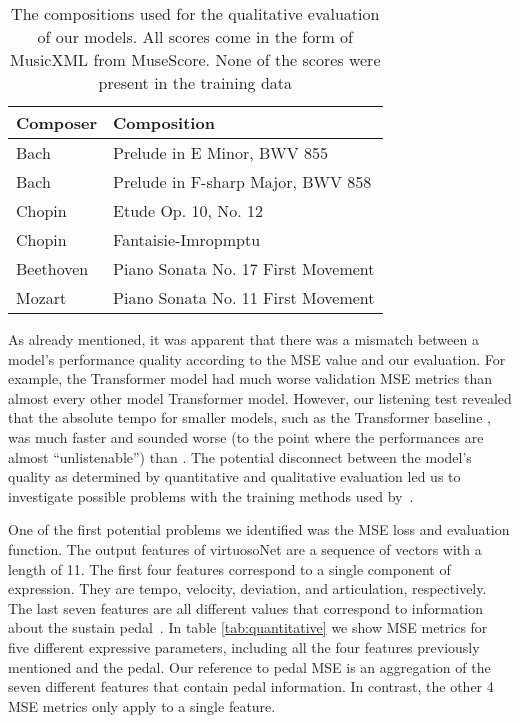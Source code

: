 \begin{table}
    \setlength{\extrarowheight}{3pt}
    \begin{center}
    \begin{tabular}[]{| l | l |}
        \hline
        Composer & Composition \\ 
        \hline 
        Bach & Prelude in E Minor, BWV 855 \\
        Bach & Prelude in F-sharp Major, BWV 858  \\ 
        Chopin & Etude Op. 10, No. 12 \\ 
        Chopin & Fantaisie-Imropmptu \\ 
        Beethoven & Piano Sonata No. 17 First Movement \\ 
        Mozart & Piano Sonata No. 11 First Movement \\ 
        \hline
    \end{tabular}
    \caption{The compositions used for the qualitative evaluation of our models. All scores come in the form of MusicXML from MuseScore. None of the scores were present in the training data}
    \label{tab:compositions}
    \end{center}
\end{table}

As already mentioned, it was apparent that there was a mismatch between a model's performance quality according to the MSE value and our evaluation. For example, the Transformer model    had much worse validation MSE metrics than almost every other model Transformer model. However, our listening test revealed that the absolute tempo for smaller models, such as the Transformer baseline , was much faster and sounded worse (to the point where the performances are almost ``unlistenable'') than . The potential disconnect between the model's quality as determined by quantitative and qualitative evaluation led us to investigate possible problems with the training methods used by~\citet{jeong2019virtuosonet}. 

One of the first potential problems we identified was the MSE loss and evaluation function. The output features of virtuosoNet are a sequence of vectors with a length of 11. The first four features correspond to a single component of expression. They are tempo, velocity, deviation, and articulation, respectively. The last seven features are all different values that correspond to information about the sustain pedal~\cite{jeong2019score}. In table \ref{tab:quantitative} we show MSE metrics for five different expressive parameters, including all the four features previously mentioned and the pedal. Our reference to pedal MSE is an aggregation of the seven different features that contain pedal information. In contrast, the other 4 MSE metrics only apply to a single feature.


